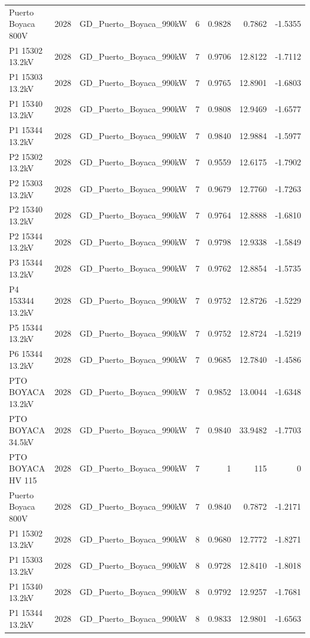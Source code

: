 \documentclass[11pt,a4paper]{article}
\begin{document}
\begin{longtable}{llllrrr}
Puerto Boyaca 800V & 2028 & GD\_Puerto\_Boyaca\_990kW & 6 & 0.9828 & 0.7862 & -1.5355 \\
P1 15302 13.2kV & 2028 & GD\_Puerto\_Boyaca\_990kW & 7 & 0.9706 & 12.8122 & -1.7112 \\
P1 15303 13.2kV & 2028 & GD\_Puerto\_Boyaca\_990kW & 7 & 0.9765 & 12.8901 & -1.6803 \\
P1 15340 13.2kV & 2028 & GD\_Puerto\_Boyaca\_990kW & 7 & 0.9808 & 12.9469 & -1.6577 \\
P1 15344 13.2kV & 2028 & GD\_Puerto\_Boyaca\_990kW & 7 & 0.9840 & 12.9884 & -1.5977 \\
P2 15302 13.2kV & 2028 & GD\_Puerto\_Boyaca\_990kW & 7 & 0.9559 & 12.6175 & -1.7902 \\
P2 15303 13.2kV & 2028 & GD\_Puerto\_Boyaca\_990kW & 7 & 0.9679 & 12.7760 & -1.7263 \\
P2 15340 13.2kV & 2028 & GD\_Puerto\_Boyaca\_990kW & 7 & 0.9764 & 12.8888 & -1.6810 \\
P2 15344 13.2kV & 2028 & GD\_Puerto\_Boyaca\_990kW & 7 & 0.9798 & 12.9338 & -1.5849 \\
P3 15344 13.2kV & 2028 & GD\_Puerto\_Boyaca\_990kW & 7 & 0.9762 & 12.8854 & -1.5735 \\
P4 153344 13.2kV & 2028 & GD\_Puerto\_Boyaca\_990kW & 7 & 0.9752 & 12.8726 & -1.5229 \\
P5 15344 13.2kV & 2028 & GD\_Puerto\_Boyaca\_990kW & 7 & 0.9752 & 12.8724 & -1.5219 \\
P6 15344 13.2kV & 2028 & GD\_Puerto\_Boyaca\_990kW & 7 & 0.9685 & 12.7840 & -1.4586 \\
PTO BOYACA 13.2kV & 2028 & GD\_Puerto\_Boyaca\_990kW & 7 & 0.9852 & 13.0044 & -1.6348 \\
PTO BOYACA 34.5kV & 2028 & GD\_Puerto\_Boyaca\_990kW & 7 & 0.9840 & 33.9482 & -1.7703 \\
PTO BOYACA HV 115 & 2028 & GD\_Puerto\_Boyaca\_990kW & 7 & 1 & 115 & 0 \\
Puerto Boyaca 800V & 2028 & GD\_Puerto\_Boyaca\_990kW & 7 & 0.9840 & 0.7872 & -1.2171 \\
P1 15302 13.2kV & 2028 & GD\_Puerto\_Boyaca\_990kW & 8 & 0.9680 & 12.7772 & -1.8271 \\
P1 15303 13.2kV & 2028 & GD\_Puerto\_Boyaca\_990kW & 8 & 0.9728 & 12.8410 & -1.8018 \\
P1 15340 13.2kV & 2028 & GD\_Puerto\_Boyaca\_990kW & 8 & 0.9792 & 12.9257 & -1.7681 \\
P1 15344 13.2kV & 2028 & GD\_Puerto\_Boyaca\_990kW & 8 & 0.9833 & 12.9801 & -1.6563 \\

\end{longtable}
\end{document}

